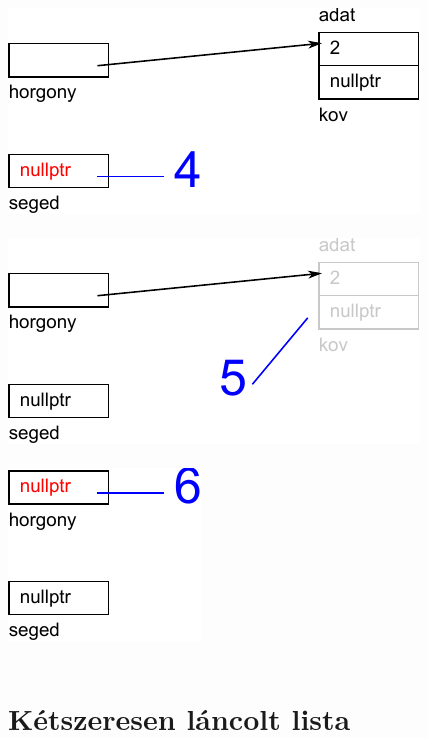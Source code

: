 \documentclass[usenames,dvipsnames,aspectratio=169]{beamer}
\begin{document}
\begin{frame}[fragile]
  \scriptsize
  \begin{columns}[T]
      \includegraphics[scale=.6]{lista1/list1-23.pdf} \\
      \hrulefill \\
      \includegraphics[scale=.6]{lista1/list1-24.pdf} \\
      \hrulefill \\
      \includegraphics[scale=.6]{lista1/list1-25.pdf}
      \begin{exampleblock}{}
        \small
        
      \end{exampleblock}
  \end{columns}
\end{frame}

\section{Kétszeresen láncolt lista}
\end{document}
